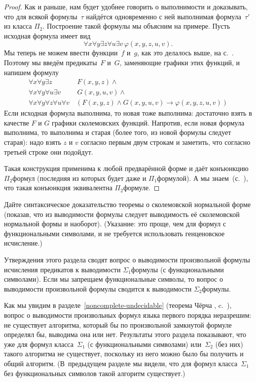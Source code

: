 \begin{proof}
Как и раньше, нам будет удобнее говорить о выполнимости и
доказывать, что для всякой формулы~$\tau$ найдётся одновременно
с ней выполнимая формула~$\tau'$ из класса $\Pi_2$.
Построение такой формулы мы объясним на примере. Пусть
исходная формула имеет вид
        $$
\forall x \forall y \exists z \forall u \exists v\,\varphi(x,y,z,u,v).
        $$
Мы теперь не можем ввести функции~$f$ и~$g$, как это делалось
выше, на с.~\pageref{skolem-functions-example}. Поэтому мы введём
предикаты~$F$ и~$G$, заменяющие графики этих функций, и напишем
формулу
       \begin{align*}
\forall x\forall y \exists z&\,\, F(x,y,z)
        \land \\
\forall x \forall y \forall u \exists v&\,\, G(x,y,u,v)
        \land\\
\forall x \forall y \forall z \forall u \forall v&\,
        (F(x,y,z)\land G(x,y,u,v) \to \varphi(x,y,z,u,v))
        \end{align*}
Если исходная формула выполнима, то новая тоже выполнима:
достаточно взять в качестве $F$ и $G$ графики сколемовских
функций. Напротив, если новая формула выполнима, то выполнима и
старая (более того, из новой формулы следует старая): надо взять
$z$ и $v$ согласно первым двум строкам и заметить, что согласно
третьей строке они подойдут.

Такая конструкция применима к любой предварённой форме и даёт
конъюнкцию $\Pi_2$\д формул (последняя из которых будет
даже и $\Pi_1$\д формулой). А мы знаем~(с.~\pageref{sigma-pi-closed}),
что такая конъюнкция эквивалентна
$\Pi_2$\д формуле.
\end{proof}

\begin{problem}
Дайте синтаксическое доказательство теоремы о сколемовской
нормальной форме (показав, что из выводимости формулы следует
выводимость её сколемовской нормальной формы и наоборот).
(Указание: это проще, чем для формул с функциональными
символами, и не требуется использовать генценовское
исчисление.)
\end{problem}

Утверждения этого раздела сводят вопрос о выводимости
произвольной формулы исчисления предикатов к выводимости
$\Sigma_1$\д формулы (с функциональными символами). Если мы
запрещаем функциональные символы, то вопрос о выводимости
произвольной формулы сводится к выводимости $\Sigma_2$\д формулы.

Как мы увидим в разделе~\ref{noncomplete-undecidable} (теорема
Чёрча%
 , c.~\pageref{church-theorem}),
вопрос о выводимости произвольных формул языка первого порядка
неразрешим: не существует алгоритма, который бы по произвольной
замкнутой формуле определял бы, выводима она или нет. Результаты
этого раздела показывают, что уже для формул класса~$\Sigma_1$
(с функциональными символами) или~$\Sigma_2$ (без них) такого
алгоритма не существует, поскольку из него можно было бы
получить и общий алгоритм. (В~предыдущем разделе мы видели, что
для формул класса~$\Sigma_1$ без функциональных символов такой
алгоритм существует.)

